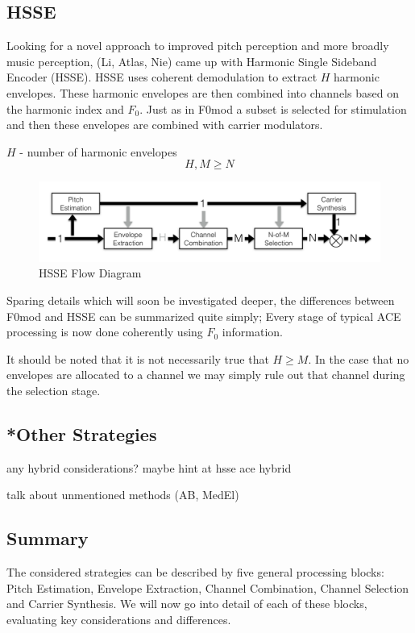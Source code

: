 \documentclass [11pt, proquest] {uwthesis}[2015/03/03]
\begin{document}
\subsection{HSSE}

Looking for a novel approach to improved pitch perception and more broadly music perception, (Li, Atlas, Nie) came up with Harmonic Single Sideband Encoder (HSSE).  HSSE uses coherent demodulation to extract $H$ harmonic envelopes.  These harmonic envelopes are then combined into channels based on the harmonic index and $F_0$.  Just as in F0mod a subset is selected for stimulation and then these envelopes are combined with carrier modulators.

$H$ - number of harmonic envelopes
$$H, M \geq N$$

\begin{figure}[!ht]
  \centering
    \includegraphics[width=1\textwidth]{HSSE_flow_diagramTEMP}   
    \caption{HSSE Flow Diagram}
\end{figure}

Sparing details which will soon be investigated deeper, the differences between F0mod and HSSE can be summarized quite simply;  Every stage of typical ACE processing is now done coherently using $F_0$ information.

It should be noted that it is not necessarily true that $H \geq M$.  In the case that no envelopes are allocated to a channel we may simply rule out that channel during the selection stage.

\subsection{*Other Strategies}

any hybrid considerations?  maybe hint at hsse ace hybrid

talk about unmentioned methods (AB, MedEl)

\subsection{Summary}

The considered strategies can be described by five general processing blocks: Pitch Estimation, Envelope Extraction, Channel Combination, Channel Selection and Carrier Synthesis.  We will now go into detail of each of these blocks, evaluating key considerations and differences.
\end{document}
